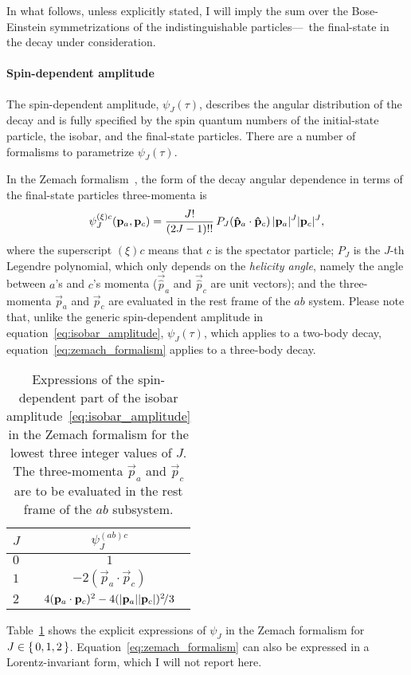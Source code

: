     In what follows, unless explicitly stated, I will imply the sum over the Bose-Einstein symmetrizations of the indistinguishable particles---\ie~the final-state \Ppiplus{} in the \PDplus{} decay under consideration.


    \paragraph{Spin-dependent amplitude}
    The spin-dependent amplitude, $\psi_J(\tau)$, describes the angular distribution of the decay and is fully specified by the spin quantum numbers of the initial-state particle, the isobar, and the final-state particles.
    There are a number of formalisms to parametrize $\psi_J(\tau)$.
    

    In the Zemach formalism~\cite[\S~V.1]{PhysRev.140.B97}, the form of the decay angular dependence in terms of the final-state particles three-momenta is
    \begin{equation}\label{eq:zemach_formalism}
        \psi_{J}^{(\xi)c}(\mathbf{{p}}_a,\mathbf{{p}}_c) = \frac{J!}{(2J-1)!!}\,P_J(\mathbf{{\hat{p}}}_a \cdot \mathbf{{\hat{p}}}_c)\,\lvert\mathbf{{p}}_a\rvert^J\lvert\mathbf{{p}}_c\rvert^J,
    \end{equation}
    where the superscript $(\xi)c$ means that $c$ is the spectator particle;
    $P_J$ is the $J$-th Legendre polynomial, which only depends on the \emph{helicity angle}, namely the angle between $a$'s and $c$'s momenta ($\vec{\hat{p}}_a$ and $\vec{\hat{p}}_c$ are unit vectors);
    and the three-momenta $\vec{p}_a$ and $\vec{p}_c$ are evaluated in the rest frame of the $ab$ system.
    Please note that, unlike the generic spin-dependent amplitude in equation~\eqref{eq:isobar_amplitude}, $\psi_J(\tau)$, which applies to a two-body decay, equation~\eqref{eq:zemach_formalism} applies to a three-body decay.
    \begin{table}
        \centering
        \caption{Expressions of the spin-dependent part of the isobar amplitude~\eqref{eq:isobar_amplitude} in the Zemach formalism for the lowest three integer values of $J$.
                 The three-momenta $\vec{p}_a$ and $\vec{p}_c$ are to be evaluated in the rest frame of the $ab$ subsystem.}
        \label{tab:zemach_formalism}
        
        \begin{tabular}{lc}
            \toprule
            $J$ &$\psi_J^{(ab)c}$\\
            \midrule
            $0$ &$1$ \\
            $1$ &$-2(\vec{p}_a\cdot\vec{p}_c)$ \\
            $2$ &$4(\mathbf{{p}}_a\cdot\mathbf{{p}}_c)^2 - 4(\lvert\mathbf{{p}}_a\rvert\lvert\mathbf{{p}}_c\rvert)^2\!/3$\\
            \bottomrule
        \end{tabular}
    \end{table}
    Table~\ref{tab:zemach_formalism} shows the explicit expressions of $\psi_J$ in the Zemach formalism for $J\in\set{0,1,2}$.
    Equation~\eqref{eq:zemach_formalism} can also be expressed in a Lorentz-invariant form, which I will not report here.


